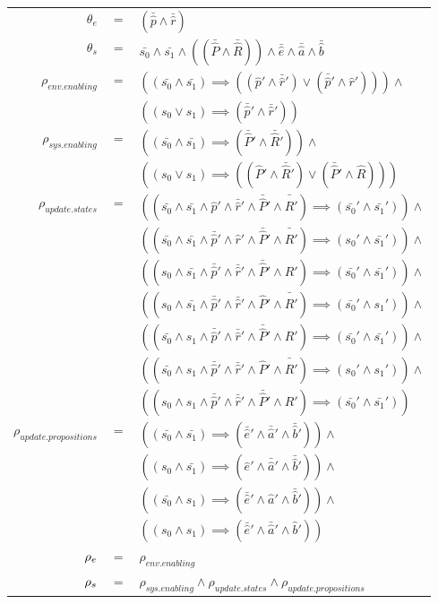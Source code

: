 \footnotesize
\vspace{1em}
\begin{tabular}{ r c l }
	$\theta_{e}$ &$=$& $(\bar{\hat{p}} \wedge \bar{\hat{r}})$\\
	$\theta_{s}$ &$=$& $\bar{s_0} \wedge \bar{s_1} \wedge ((\bar{\hat{P}} \wedge \bar{\hat{R}})) \wedge \bar{\hat{e}} \wedge \bar{\hat{a}} \wedge \bar{\hat{b}}$\\	
	$\rho_{env.enabling}$ &$=$& $((\bar{s_0} \wedge \bar{s_1} ) \implies ((\hat{p}'\wedge \bar{\hat{r}}') \vee (\bar{\hat{p}}' \wedge \hat{r}'))) \wedge$\\
	&& $((s_0 \vee s_1 ) \implies (\bar{\hat{p}}' \wedge \bar{\hat{r}}'))$\\	
	$\rho_{sys.enabling}$ &$=$& $((\bar{s_0} \wedge \bar{s_1} ) \implies (\bar{\hat{P}}' \wedge \bar{\hat{R}}')) \wedge$\\
	&& $((s_0 \vee s_1 ) \implies ((\hat{P}'\wedge \bar{\hat{R}}') \vee (\bar{\hat{P}}' \wedge  \hat{R})))$\\		
	$\rho_{update.states}$ &$=$& $((\bar{s_0} \wedge \bar{s_1} \wedge \hat{p}'\wedge \bar{\hat{r}}' \wedge \bar{\hat{P}}' \wedge \bar{\hat{R}}') \implies (\bar{s_0}' \wedge \bar{s_1}')) \wedge$\\
	&&$((\bar{s_0} \wedge \bar{s_1} \wedge \bar{\hat{p}}' \wedge \hat{r}'\wedge \bar{\hat{P}}' \wedge \bar{\hat{R}}') \implies (s_0' \wedge \bar{s_1}')) \wedge$\\	
	&&$((s_0 \wedge \bar{s_1} \wedge \bar{\hat{p}}' \wedge \bar{\hat{r}}' \wedge \bar{\hat{P}}' \wedge \hat{R}')\implies (\bar{s_0}' \wedge \bar{s_1}')) \wedge$\\	
	&&$((s_0 \wedge \bar{s_1} \wedge \bar{\hat{p}}' \wedge \bar{\hat{r}}' \wedge \hat{P}'\wedge \bar{\hat{R}}') \implies (\bar{s_0}' \wedge s_1')) \wedge$\\	
	&&$((\bar{s_0} \wedge s_1 \wedge \bar{\hat{p}}' \wedge \bar{\hat{r}}' \wedge \bar{\hat{P}}' \wedge \hat{R}')\implies (\bar{s_0}' \wedge \bar{s_1}')) \wedge$\\		
	&&$((\bar{s_0} \wedge s_1 \wedge \bar{\hat{p}}' \wedge \bar{\hat{r}}' \wedge \hat{P}'\wedge \bar{\hat{R}}') \implies (s_0' \wedge s_1')) \wedge$\\		
	&&$((s_0 \wedge s_1 \wedge \bar{\hat{p}}' \wedge \bar{\hat{r}}' \wedge \bar{\hat{P}}' \wedge \hat{R}')\implies (\bar{s_0}' \wedge \bar{s_1}'))$\\	
	$\rho_{update.propositions}$ &$=$& $((\bar{s_0} \wedge \bar{s_1}) \implies (\bar{\hat{e}}' \wedge \bar{\hat{a}}' \wedge \bar{\hat{b}}')) \wedge$\\
	&& $((s_0 \wedge \bar{s_1}) \implies (\hat{e}' \wedge \bar{\hat{a}}' \wedge \bar{\hat{b}}')) \wedge$\\
	&& $((\bar{s_0} \wedge s_1) \implies (\bar{\hat{e}}' \wedge \hat{a}' \wedge \bar{\hat{b}}')) \wedge$\\
	&& $((s_0 \wedge s_1) \implies (\bar{\hat{e}}' \wedge \bar{\hat{a}}' \wedge \hat{b}'))$\\	
	${\rho_e}$&$=$&$\rho_{env.enabling}$\\		
	${\rho_s}$&$=$&$\rho_{sys.enabling} \wedge  \rho_{update.states} \wedge  \rho_{update.propositions}$\\	
\end{tabular}
